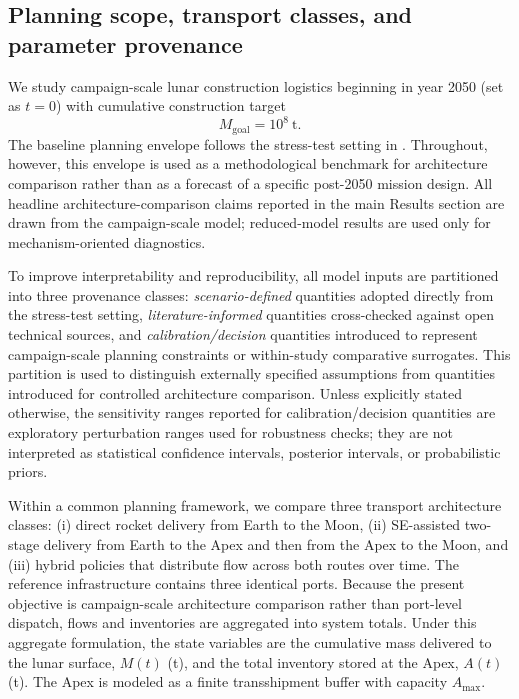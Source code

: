 \documentclass[12pt]{article}
\begin{document}
\subsection{Planning scope, transport classes, and parameter provenance}
\label{sec:methods_problem}

We study campaign-scale lunar construction logistics beginning in year 2050 (set as $t=0$) with cumulative construction target
\[
M_{\mathrm{goal}} = 10^8 \ \text{t}.
\]
The baseline planning envelope follows the stress-test setting in \cite{COMAP2026B}. Throughout, however, this envelope is used as a methodological benchmark for architecture comparison rather than as a forecast of a specific post-2050 mission design. All headline architecture-comparison claims reported in the main Results section are drawn from the campaign-scale model; reduced-model results are used only for mechanism-oriented diagnostics.

To improve interpretability and reproducibility, all model inputs are partitioned into three provenance classes: \emph{scenario-defined} quantities adopted directly from the stress-test setting, \emph{literature-informed} quantities cross-checked against open technical sources, and \emph{calibration/decision} quantities introduced to represent campaign-scale planning constraints or within-study comparative surrogates. This partition is used to distinguish externally specified assumptions from quantities introduced for controlled architecture comparison. Unless explicitly stated otherwise, the sensitivity ranges reported for calibration/decision quantities are exploratory perturbation ranges used for robustness checks; they are not interpreted as statistical confidence intervals, posterior intervals, or probabilistic priors.

Within a common planning framework, we compare three transport architecture classes:
(i) direct rocket delivery from Earth to the Moon,
(ii) SE-assisted two-stage delivery from Earth to the Apex and then from the Apex to the Moon, and
(iii) hybrid policies that distribute flow across both routes over time.
The reference infrastructure contains three identical ports. Because the present objective is campaign-scale architecture comparison rather than port-level dispatch, flows and inventories are aggregated into system totals. Under this aggregate formulation, the state variables are the cumulative mass delivered to the lunar surface, $M(t)$ (t), and the total inventory stored at the Apex, $A(t)$ (t). The Apex is modeled as a finite transshipment buffer with capacity $A_{\max}$.
\end{document}
